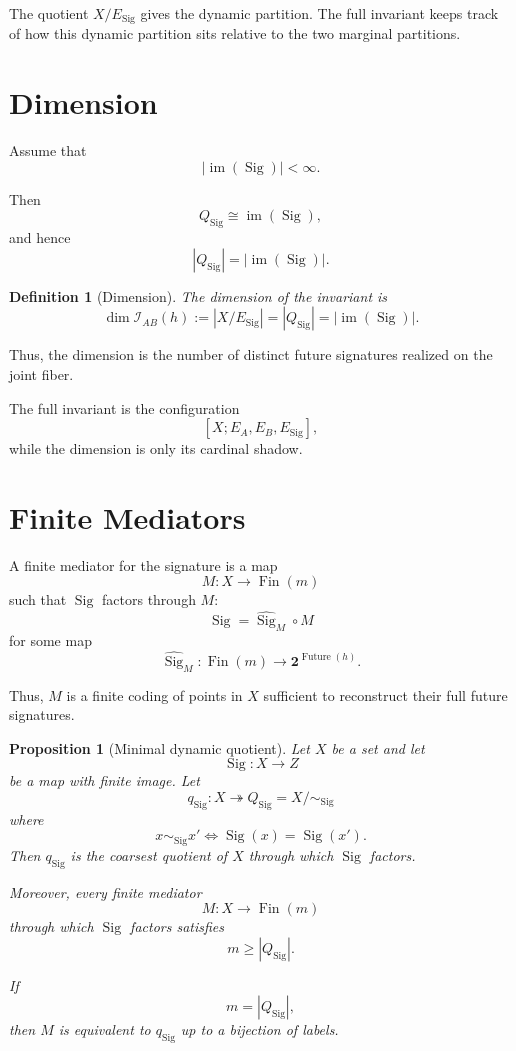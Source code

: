 \documentclass[11pt]{article}
\newcommand{\Fin}{\operatorname{Fin}}
\newcommand{\Future}{\operatorname{Future}}
\newcommand{\Sig}{\operatorname{Sig}}
\newcommand{\im}{\operatorname{im}}
\newcommand{\two}{\mathbf{2}}
\newtheorem{definition}{Definition}
\newtheorem{proposition}{Proposition}
\begin{document}
The quotient \(X/E_\Sig\) gives the dynamic partition. The full invariant keeps track of how this dynamic partition sits relative to the two marginal partitions.

\section{Dimension}

Assume that
\[
|\im(\Sig)|<\infty.
\]

Then
\[
Q_\Sig\cong \im(\Sig),
\]
and hence
\[
|Q_\Sig|=|\im(\Sig)|.
\]

\begin{definition}[Dimension]
The dimension of the invariant is
\[
\boxed{
\dim\mathcal I_{AB}(h):=|X/E_\Sig|=|Q_\Sig|=|\im(\Sig)|.
}
\]
\end{definition}

Thus, the dimension is the number of distinct future signatures realized on the joint fiber.

The full invariant is the configuration
\[
[X;E_A,E_B,E_\Sig],
\]
while the dimension is only its cardinal shadow.

\section{Finite Mediators}

A finite mediator for the signature is a map
\[
M:X\to \Fin(m)
\]
such that \(\Sig\) factors through \(M\):
\[
\Sig=\widehat{\Sig}_M\circ M
\]
for some map
\[
\widehat{\Sig}_M:\Fin(m)\to \two^{\Future(h)}.
\]

Thus, \(M\) is a finite coding of points in \(X\) sufficient to reconstruct their full future signatures.

\begin{proposition}[Minimal dynamic quotient]
Let \(X\) be a set and let
\[
\Sig:X\to Z
\]
be a map with finite image.
Let
\[
q_\Sig:X\twoheadrightarrow Q_\Sig=X/{\sim_\Sig}
\]
where
\[
x\sim_\Sig x'
\iff
\Sig(x)=\Sig(x').
\]
Then \(q_\Sig\) is the coarsest quotient of \(X\) through which \(\Sig\) factors.

Moreover, every finite mediator
\[
M:X\to\Fin(m)
\]
through which \(\Sig\) factors satisfies
\[
m\ge |Q_\Sig|.
\]

If
\[
m=|Q_\Sig|,
\]
then \(M\) is equivalent to \(q_\Sig\) up to a bijection of labels.
\end{proposition}
\end{document}
